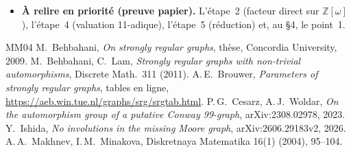 \documentclass[11pt,a4paper]{article}
\theoremstyle{remark}
\newcommand{\Z}{\mathbb{Z}}
\begin{document}
\begin{itemize}[leftmargin=*]
Lean~4 (Mathlib \texttt{v4.35.0-rc2}), sans \texttt{sorry}, à partir de la définition de Mathlib d'un graphe fortement régulier
(\texttt{SimpleGraph.IsSRGWith}) : \texttt{C3.no\_free\_order3}, \texttt{C3.no\_triangle\_order3} (exactement trois points fixes ;
le triangle y est démontré) et \texttt{C3.no\_order3\_fix\_le3} (au plus trois points fixes). Ils ne dépendent que des axiomes
standard \texttt{propext}, \texttt{Classical.choice} et \texttt{Quot.sound}, et n'emploient que des définitions de Mathlib : un
relecteur n'a à contrôler que ces énoncés. Les versions matricielles (théorème~\ref{thm:matrices} et §4) sont aussi vérifiées
(\texttt{C3.no\_pair}, \texttt{C3.Tri.no\_triangle\_pair}). Seul le théorème de Makhnev--Minakova (corollaire~\ref{cor:tout})
n'est pas formalisé. Sources : dossier \texttt{c3formal/}.
\item \textbf{À relire en priorité (preuve papier).} L'étape~2 (facteur direct sur $\Z[\omega]$), l'étape~4 (valuation 11-adique),
l'étape~5 (réduction) et, au §4, le point~1.
\end{itemize}

{\small
\begin{thebibliography}{MM04}
 M.~Behbahani, \emph{On strongly regular graphs}, thèse, Concordia University, 2009.
 M.~Behbahani, C.~Lam, \emph{Strongly regular graphs with non-trivial automorphisms}, Discrete Math.\ 311 (2011).
 A.\,E.~Brouwer, \emph{Parameters of strongly regular graphs}, tables en ligne,
\url{https://aeb.win.tue.nl/graphs/srg/srgtab.html}.
 P.\,G.~Cesarz, A.\,J.~Woldar, \emph{On the automorphism group of a putative Conway 99-graph},
arXiv:2308.02978, 2023.
 Y.~Ishida, \emph{No involutions in the missing Moore graph}, arXiv:2606.29183v2, 2026.
 A.\,A.~Makhnev, I.\,M.~Minakova, Diskretnaya Matematika 16(1) (2004), 95--104.
\end{thebibliography}
}
\end{document}
